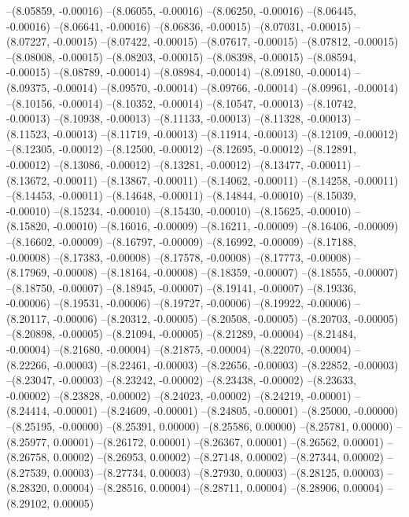 --(8.05859, -0.00016)
--(8.06055, -0.00016)
--(8.06250, -0.00016)
--(8.06445, -0.00016)
--(8.06641, -0.00016)
--(8.06836, -0.00015)
--(8.07031, -0.00015)
--(8.07227, -0.00015)
--(8.07422, -0.00015)
--(8.07617, -0.00015)
--(8.07812, -0.00015)
--(8.08008, -0.00015)
--(8.08203, -0.00015)
--(8.08398, -0.00015)
--(8.08594, -0.00015)
--(8.08789, -0.00014)
--(8.08984, -0.00014)
--(8.09180, -0.00014)
--(8.09375, -0.00014)
--(8.09570, -0.00014)
--(8.09766, -0.00014)
--(8.09961, -0.00014)
--(8.10156, -0.00014)
--(8.10352, -0.00014)
--(8.10547, -0.00013)
--(8.10742, -0.00013)
--(8.10938, -0.00013)
--(8.11133, -0.00013)
--(8.11328, -0.00013)
--(8.11523, -0.00013)
--(8.11719, -0.00013)
--(8.11914, -0.00013)
--(8.12109, -0.00012)
--(8.12305, -0.00012)
--(8.12500, -0.00012)
--(8.12695, -0.00012)
--(8.12891, -0.00012)
--(8.13086, -0.00012)
--(8.13281, -0.00012)
--(8.13477, -0.00011)
--(8.13672, -0.00011)
--(8.13867, -0.00011)
--(8.14062, -0.00011)
--(8.14258, -0.00011)
--(8.14453, -0.00011)
--(8.14648, -0.00011)
--(8.14844, -0.00010)
--(8.15039, -0.00010)
--(8.15234, -0.00010)
--(8.15430, -0.00010)
--(8.15625, -0.00010)
--(8.15820, -0.00010)
--(8.16016, -0.00009)
--(8.16211, -0.00009)
--(8.16406, -0.00009)
--(8.16602, -0.00009)
--(8.16797, -0.00009)
--(8.16992, -0.00009)
--(8.17188, -0.00008)
--(8.17383, -0.00008)
--(8.17578, -0.00008)
--(8.17773, -0.00008)
--(8.17969, -0.00008)
--(8.18164, -0.00008)
--(8.18359, -0.00007)
--(8.18555, -0.00007)
--(8.18750, -0.00007)
--(8.18945, -0.00007)
--(8.19141, -0.00007)
--(8.19336, -0.00006)
--(8.19531, -0.00006)
--(8.19727, -0.00006)
--(8.19922, -0.00006)
--(8.20117, -0.00006)
--(8.20312, -0.00005)
--(8.20508, -0.00005)
--(8.20703, -0.00005)
--(8.20898, -0.00005)
--(8.21094, -0.00005)
--(8.21289, -0.00004)
--(8.21484, -0.00004)
--(8.21680, -0.00004)
--(8.21875, -0.00004)
--(8.22070, -0.00004)
--(8.22266, -0.00003)
--(8.22461, -0.00003)
--(8.22656, -0.00003)
--(8.22852, -0.00003)
--(8.23047, -0.00003)
--(8.23242, -0.00002)
--(8.23438, -0.00002)
--(8.23633, -0.00002)
--(8.23828, -0.00002)
--(8.24023, -0.00002)
--(8.24219, -0.00001)
--(8.24414, -0.00001)
--(8.24609, -0.00001)
--(8.24805, -0.00001)
--(8.25000, -0.00000)
--(8.25195, -0.00000)
--(8.25391, 0.00000)
--(8.25586, 0.00000)
--(8.25781, 0.00000)
--(8.25977, 0.00001)
--(8.26172, 0.00001)
--(8.26367, 0.00001)
--(8.26562, 0.00001)
--(8.26758, 0.00002)
--(8.26953, 0.00002)
--(8.27148, 0.00002)
--(8.27344, 0.00002)
--(8.27539, 0.00003)
--(8.27734, 0.00003)
--(8.27930, 0.00003)
--(8.28125, 0.00003)
--(8.28320, 0.00004)
--(8.28516, 0.00004)
--(8.28711, 0.00004)
--(8.28906, 0.00004)
--(8.29102, 0.00005)
